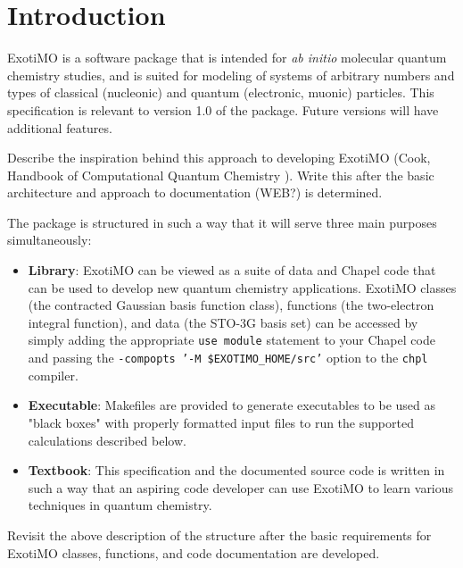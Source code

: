\label{Scope}

\section{Introduction}

ExotiMO is a software package that is intended for \textit{ab initio} molecular quantum chemistry
studies, and is suited for modeling of systems of arbitrary numbers and types of 
classical (\eg nucleonic) and quantum (\eg electronic, muonic) particles. 
This specification is relevant to version 1.0 of the package. Future versions
will have additional features.

\begin{TODO}
Describe the inspiration behind this approach to developing ExotiMO (Cook, Handbook of Computational Quantum 
Chemistry \cite{cook}).  Write this after the basic architecture and approach to documentation (WEB?) is determined.
\end{TODO}

The package is structured in such a way that it will serve three main purposes simultaneously:
\begin{itemize}
\item \textbf{Library}: ExotiMO can be viewed as a suite of data and Chapel code that can be used to 
develop new quantum chemistry applications. ExotiMO classes (\eg the contracted Gaussian basis function class), 
functions (\eg the two-electron integral function), and data (\eg the STO-3G basis set) can be accessed 
by simply adding the appropriate \lstinline{use module} statement to your Chapel code and passing the
{\footnotesize\texttt{-compopts '-M \$EXOTIMO\_HOME/src'}} option to the 
\lstinline{chpl} compiler.
\item \textbf{Executable}: Makefiles are provided to generate executables to be used as "black boxes" with
properly formatted input files to run the supported calculations described below.
\item \textbf{Textbook}: This specification and the documented source code is written in such a way that an 
aspiring code developer can use ExotiMO to learn various techniques in quantum chemistry.
\end{itemize}

\begin{TODO}
Revisit the above description of the structure after the basic requirements for ExotiMO classes, 
functions, and code documentation are developed.
\end{TODO}

